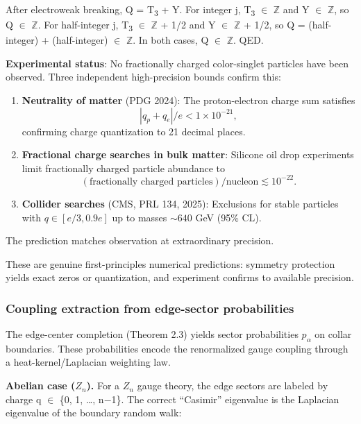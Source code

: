 \documentclass[11pt,a4paper]{article}
\theoremstyle{remark}
\begin{document}
After electroweak breaking, Q = T\textsubscript{3} + Y. For integer j, T\textsubscript{3} \ensuremath{\in} \ensuremath{\mathbb{Z}} and Y \ensuremath{\in} \ensuremath{\mathbb{Z}},
so Q \ensuremath{\in} \ensuremath{\mathbb{Z}}. For half-integer j, T\textsubscript{3} \ensuremath{\in} \ensuremath{\mathbb{Z}} + 1/2 and Y \ensuremath{\in} \ensuremath{\mathbb{Z}} + 1/2, so
Q = (half-integer) + (half-integer) \ensuremath{\in} \ensuremath{\mathbb{Z}}. In both cases, Q \ensuremath{\in} \ensuremath{\mathbb{Z}}. QED.

\textbf{Experimental status}: No fractionally charged color-singlet particles
have been observed. Three independent high-precision bounds confirm this:

\begin{enumerate}
\def\labelenumi{\arabic{enumi}.}
\item
  \textbf{Neutrality of matter} (PDG 2024): The proton-electron charge sum satisfies
  \[|q_p + q_e|/e < 1 \times 10^{-21},\]
  confirming charge quantization to 21 decimal places.
\item
  \textbf{Fractional charge searches in bulk matter}: Silicone oil drop experiments
  limit fractionally charged particle abundance to
  \[(\text{fractionally charged particles})/\text{nucleon} \lesssim 10^{-22}.\]
\item
  \textbf{Collider searches} (CMS, PRL 134, 2025): Exclusions for stable particles
  with \(q \in [e/3, 0.9e]\) up to masses \(\sim 640\) GeV (95\% CL).
\end{enumerate}

The prediction matches observation at extraordinary precision.

These are genuine first-principles numerical predictions: symmetry protection
yields exact zeros or quantization, and experiment confirms to available precision.

\subsubsection{Coupling extraction from edge-sector probabilities}\label{coupling-extraction-from-edge-sector-probabilities}

The edge-center completion (Theorem 2.3) yields sector probabilities \(p_\ensuremath{\alpha}\)
on collar boundaries. These probabilities encode the renormalized gauge
coupling through a heat-kernel/Laplacian weighting law.

\textbf{Abelian case (\(Z_n\)).} For a \(Z_n\) gauge theory, the edge
sectors are labeled by charge q \ensuremath{\in} \{0, 1, \ldots, n\ensuremath{-}1\}. The correct
``Casimir'' eigenvalue is the Laplacian eigenvalue of the boundary random walk:
\end{document}
